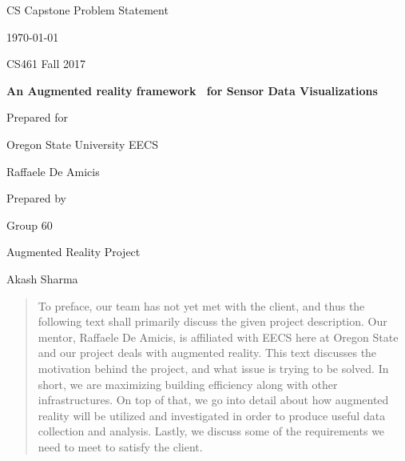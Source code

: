 \documentclass[onecolumn, draftclsnofoot,10pt, compsoc]{IEEEtran}
\def \CapstoneTeamName{			Augmented Reality Project}
\def \CapstoneTeamNumber{		60}
\def \GroupMemberOne{			Akash Sharma}
\def \GroupMemberTwo{			Ross Shoger}
\def \GroupMemberThree{			Sean Wilton}
\def \CapstoneProjectName{		An Augmented reality framework  for Sensor Data Visualizations }
\def \CapstoneSponsorCompany{	Oregon State University EECS}
\def \CapstoneSponsorPerson{	Raffaele De Amicis}
\def \DocType{		Problem Statement
				}
\newcommand{\NameSigPair}[1]{\par
\makebox[2.75in][r]{#1} \hfil 	\makebox[3.25in]{\makebox[2.25in]{\hrulefill} \hfill		\makebox[.75in]{\hrulefill}}
\par\vspace{-12pt} \textit{\tiny\noindent
\makebox[2.75in]{} \hfil		\makebox[3.25in]{\makebox[2.25in][r]{Signature} \hfill	\makebox[.75in][r]{Date}}}}
\renewcommand{\NameSigPair}[1]{#1}
\begin{document}
\begin{titlepage}
    \begin{singlespace}
        \hfill 
        \par\vspace{.2in}
        \centering
        \scshape{
            \huge CS Capstone \DocType \par
            {\large\today}\par
			{\large CS461 Fall 2017}\par
            \vspace{.5in}
            \textbf{\Huge\CapstoneProjectName}\par
            \vfill
            {\large Prepared for}\par
            \Huge \CapstoneSponsorCompany\par
            \vspace{5pt}
            {\Large\NameSigPair{\CapstoneSponsorPerson}\par}
            {\large Prepared by }\par
            Group\CapstoneTeamNumber\par
            \CapstoneTeamName\par 
            \vspace{5pt}
            {\Large
                \NameSigPair{\GroupMemberOne}\par
            }
            \vspace{20pt}
        }
        \begin{abstract}
        To preface, our team has not yet met with the client, and thus the following text shall primarily discuss the given project description. Our mentor, Raffaele De Amicis, is affiliated with EECS here at Oregon State and our project deals with augmented reality. This text discusses the motivation behind the project, and what issue is trying to be solved. In short, we are maximizing building efficiency along with other infrastructures. On top of that, we go into detail about how augmented reality will be utilized and investigated in order to produce useful data collection and analysis. Lastly, we discuss some of the requirements we need to meet to satisfy the client.     
        \end{abstract}     
    \end{singlespace}
\end{titlepage}
\newpage
{}
\tableofcontents
\clearpage
\end{document}
